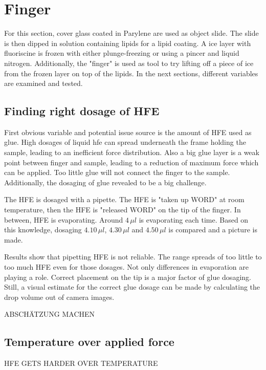 \FloatBarrier
\section{Finger}

For this section, cover glass coated in Parylene are used as object slide. The slide is then dipped in solution containing lipids for a lipid coating. A ice layer with fluoriscine is frozen with either plunge-freezing or using a pincer and liquid nitrogen. Additionally, the "finger" is used as tool to try lifting off a piece of ice from the frozen layer on top of the lipids. In the next sections, different variables are examined and tested.

\subsection{Finding right dosage of HFE}

First obvious variable and potential issue source is the amount of HFE used as glue. High dosages of liquid hfe can spread underneath the frame holding the sample, leading to an inefficient force distribution. Also a big glue layer is a weak point between finger and sample, leading to a reduction of maximum force which can be applied. Too little glue will not connect the finger to the sample. Additionally, the dosaging of glue revealed to be a big challenge.

The HFE is dosaged with a pipette. The HFE is "taken up WORD" at room temperature, then the HFE is "released WORD" on the tip of the finger. In between, HFE is evaporating. Around $4\,\mu l$ is evaporating each time. Based on this knowledge, dosaging $4.10\,\mu l$, $4.30\,\mu l$ and $4.50\,\mu l$ is compared and a picture is made.

Results show that pipetting HFE is not reliable. The range spreads of too little to too much HFE even for those dosages. Not only differences in evaporation are playing a role. Correct placement on the tip is a major factor of glue dosaging. Still, a visual estimate for the correct glue dosage can be made by calculating the drop volume out of camera images.

ABSCHÄTZUNG MACHEN

\subsection{Temperature over applied force}

HFE GETS HARDER OVER TEMPERATURE


